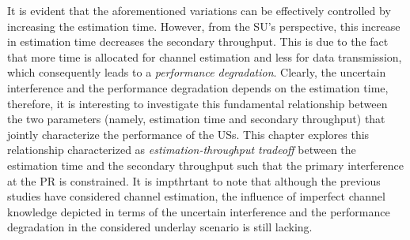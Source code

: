 It is evident that the aforementioned variations can be effectively controlled by increasing the estimation time. However, from the SU's perspective, this increase in estimation time decreases the secondary throughput. This is due to the fact that more time is allocated for channel estimation and less for data transmission, which consequently leads to a \textit{performance degradation}. 
Clearly, the uncertain interference and the performance degradation depends on the estimation time, therefore, it is interesting to investigate this fundamental relationship between the two parameters (namely, estimation time and secondary throughput) that jointly characterize the performance of the USs. %
  This chapter explores this relationship characterized as \textit{estimation-throughput tradeoff} between the estimation time and the secondary throughput such that the primary interference at the PR is constrained. It is impthrtant to note that although the previous studies \cite{Musa09, Suraweera10, Kim12} have considered channel estimation, the influence of imperfect channel knowledge depicted in terms of the uncertain interference and the performance degradation in the considered underlay scenario is still lacking. 
 

